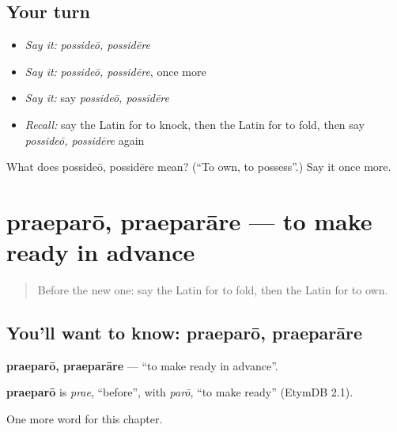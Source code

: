 \subsection*{Your turn}
\begin{itemize}
\raggedright
  \item \emph{Say it:} \emph{possideō, possidēre}
  \item \emph{Say it:} \emph{possideō, possidēre}, once more
  \item \emph{Say it:} say \emph{possideō, possidēre}
  \item \emph{Recall:} say the Latin for to knock, then the Latin for to fold, then say \emph{possideō, possidēre} again
\end{itemize}

\begin{tcolorbox}[breakable,colback=teal!4,colframe=teal!35!black,title={Before you move on}]
What does possideō, possidēre mean? (\textquotedblleft{}To own, to possess\textquotedblright{}.) Say it once more.
\end{tcolorbox}
\section[praeparō, praeparāre]{praeparō, praeparāre — to make ready in advance}

\label{lesson:LA-C168-praeparo}



\begin{quote}
Before the new one: say the Latin for to fold, then the Latin for to own.
\end{quote}

\subsection*{You'll want to know: praeparō, praeparāre}
\textbf{praeparō, praeparāre} — \textquotedblleft{}to make ready in advance\textquotedblright{}.

\begin{cousinweb}
\textbf{praeparō} is \emph{prae}, \textquotedblleft{}before\textquotedblright{}, with \emph{parō}, \textquotedblleft{}to make ready\textquotedblright{} (EtymDB 2.1).
\end{cousinweb}

\begin{grammarlens}[title={What you've built}]
One more word for this chapter.
\end{grammarlens}

